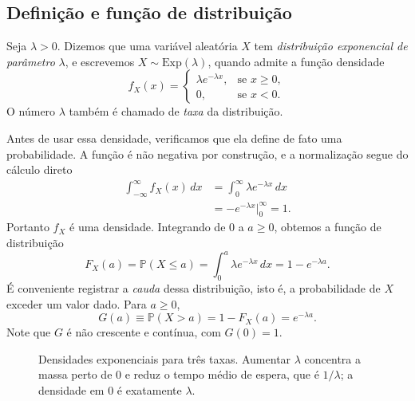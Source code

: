 \subsection{Definição e função de distribuição}

\begin{definition}\label{def:distribuicao-exponencial}
Seja $\lambda>0$. Dizemos que uma variável aleatória $X$ tem
\emph{distribuição exponencial de parâmetro} $\lambda$, e escrevemos
$X\sim\mathrm{Exp}(\lambda)$, quando admite a função densidade
\[
  f_X(x)=
  \begin{cases}
    \lambda e^{-\lambda x}, & \text{se } x\geqslant 0,
    \\[0.2cm]
    0, & \text{se } x<0.
  \end{cases}
\]
O número $\lambda$ também é chamado de \emph{taxa} da distribuição.
\end{definition}

Antes de usar essa densidade, verificamos que ela define de fato uma
probabilidade. A função é não negativa por construção, e a normalização segue
do cálculo direto
\begin{align*}
  \int_{-\infty}^{\infty} f_X(x)\,dx
  &= \int_0^{\infty} \lambda e^{-\lambda x}\,dx
  \\[0.3cm]
  &= -e^{-\lambda x}\Big|_0^{\infty}
  = 1.
\end{align*}
Portanto $f_X$ é uma densidade. Integrando de $0$ a $a\geqslant 0$, obtemos a
função de distribuição
\begin{equation}\label{eq:fda-exponencial}
  F_X(a)=\mathbb{P}(X\leqslant a)
  =\int_0^a \lambda e^{-\lambda x}\,dx
  =1-e^{-\lambda a}.
\end{equation}
É conveniente registrar a \emph{cauda} dessa distribuição, isto é, a
probabilidade de $X$ exceder um valor dado. Para $a\geqslant 0$,
\begin{equation}\label{eq:cauda-exponencial}
  G(a)\equiv\mathbb{P}(X>a)=1-F_X(a)=e^{-\lambda a}.
\end{equation}
Note que $G$ é não crescente e contínua, com $G(0)=1$.

\begin{figure}[htbp]
\centering
{}
\caption{Densidades exponenciais para três taxas. Aumentar $\lambda$
concentra a massa perto de $0$ e reduz o tempo médio de espera, que é
$1/\lambda$; a densidade em $0$ é exatamente $\lambda$.}
\label{fig:densidades-exponenciais}
\end{figure}

